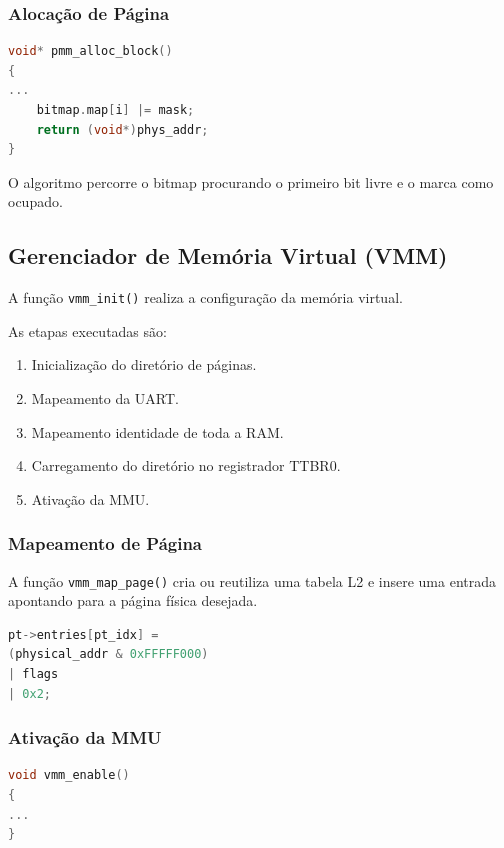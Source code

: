 \subsubsection{Alocação de Página}

\begin{lstlisting}[language=C]
void* pmm_alloc_block()
{
...
    bitmap.map[i] |= mask;
    return (void*)phys_addr;
}
\end{lstlisting}

O algoritmo percorre o bitmap procurando o primeiro bit livre e o marca como ocupado.

\subsection{Gerenciador de Memória Virtual (VMM)}

A função \texttt{vmm\_init()} realiza a configuração da memória virtual.

As etapas executadas são:

\begin{enumerate}
\item Inicialização do diretório de páginas.
\item Mapeamento da UART.
\item Mapeamento identidade de toda a RAM.
\item Carregamento do diretório no registrador TTBR0.
\item Ativação da MMU.
\end{enumerate}

\subsubsection{Mapeamento de Página}

A função \texttt{vmm\_map\_page()} cria ou reutiliza uma tabela L2 e insere uma entrada apontando para a página física desejada.

\begin{lstlisting}[language=C]
pt->entries[pt_idx] =
(physical_addr & 0xFFFFF000)
| flags
| 0x2;
\end{lstlisting}

\subsubsection{Ativação da MMU}

\begin{lstlisting}[language=C]
void vmm_enable()
{
...
}
\end{lstlisting}

